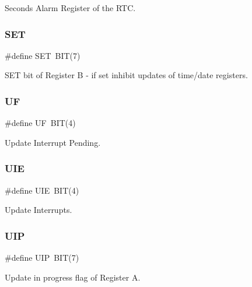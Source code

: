 Seconds Alarm Register of the R\+TC. 

\mbox{\label{group__rtc_ga59da1d65e87a723efe808dbabb4fc205}} 
\subsubsection{\texorpdfstring{S\+ET}{SET}}
{\footnotesize\ttfamily \#define S\+ET~B\+IT(7)}



S\+ET bit of Register B -\/ if set inhibit updates of time/date registers. 

\mbox{\label{group__rtc_ga2657a76f02e47fa3f3320fa9c6353f31}} 
\subsubsection{\texorpdfstring{UF}{UF}}
{\footnotesize\ttfamily \#define UF~B\+IT(4)}



Update Interrupt Pending. 

\mbox{\label{group__rtc_ga2c276876faf62c1b29fe2383ce4ccfda}} 
\subsubsection{\texorpdfstring{U\+IE}{UIE}}
{\footnotesize\ttfamily \#define U\+IE~B\+IT(4)}



Update Interrupts. 

\mbox{\label{group__rtc_ga3289eebd69837790d4aacaccd18d46db}} 
\subsubsection{\texorpdfstring{U\+IP}{UIP}}
{\footnotesize\ttfamily \#define U\+IP~B\+IT(7)}



Update in progress flag of Register A. 

\mbox{\label{group__rtc_ga5871356500f559add06ea81d60331b1b}} 
